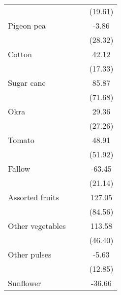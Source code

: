 {\begin{tabular}{l*{3}{c}}
                    &                     &                     &     (19.61)         \\
[1em]
Pigeon pea          &                     &                     &       -3.86         \\
                    &                     &                     &     (28.32)         \\
[1em]
Cotton              &                     &                     &       42.12\sym{*}  \\
                    &                     &                     &     (17.33)         \\
[1em]
Sugar cane          &                     &                     &       85.87         \\
                    &                     &                     &     (71.68)         \\
[1em]
Okra                &                     &                     &       29.36         \\
                    &                     &                     &     (27.26)         \\
[1em]
Tomato              &                     &                     &       48.91         \\
                    &                     &                     &     (51.92)         \\
[1em]
Fallow              &                     &                     &      -63.45\sym{**} \\
                    &                     &                     &     (21.14)         \\
[1em]
Assorted fruits     &                     &                     &      127.05         \\
                    &                     &                     &     (84.56)         \\
[1em]
Other vegetables    &                     &                     &      113.58\sym{*}  \\
                    &                     &                     &     (46.40)         \\
[1em]
Other pulses        &                     &                     &       -5.63         \\
                    &                     &                     &     (12.85)         \\
[1em]
Sunflower           &                     &                     &      -36.66\sym{*}  \\

\end{tabular}}
